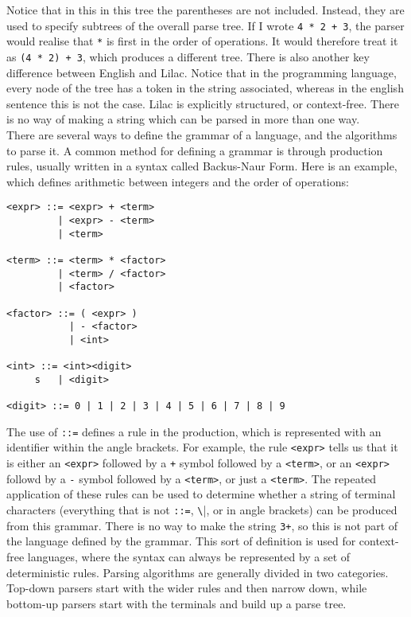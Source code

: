 \documentclass[a4paper, 11pt]{report}
\begin{document}
Notice that in this in this tree the parentheses are not included. Instead, they are used to specify subtrees of the overall parse tree. If I wrote \verb|4 * 2 + 3|, the parser would realise that \verb|*| is first in the order of operations. It would therefore treat it as \verb|(4 * 2) + 3|, which produces a different tree. There is also another key difference between English and Lilac. Notice that in the programming language, every node of the tree has a token in the string associated, whereas in the english sentence this is not the case. Lilac is explicitly structured, or context-free. There is no way of making a string which can be parsed in more than one way.\\

There are several ways to define the grammar of a language, and the algorithms to parse it. A common method for defining a grammar is through production rules, usually written in a syntax called Backus-Naur Form. Here is an example, which defines arithmetic between integers and the order of operations:
\begin{verbatim}
<expr> ::= <expr> + <term>
         | <expr> - <term>
         | <term>

<term> ::= <term> * <factor>
         | <term> / <factor>
         | <factor>

<factor> ::= ( <expr> )
           | - <factor>
           | <int>

<int> ::= <int><digit>
     s   | <digit>

<digit> ::= 0 | 1 | 2 | 3 | 4 | 5 | 6 | 7 | 8 | 9
\end{verbatim}

The use of \verb|::=| defines a rule in the production, which is represented with an identifier within the angle brackets. For example, the rule \verb|<expr>| tells us that it is either an \verb|<expr>| followed by a \verb|+| symbol followed by a \verb|<term>|, or an \verb|<expr>| followd by a \verb|-| symbol followed by a \verb|<term>|, or just a \verb|<term>|. The repeated application of these rules can be used to determine whether a string of terminal characters (everything that is not \verb|::=|, \verb|\||, or in angle brackets) can be produced from this grammar. There is no way to make the string \verb|3+|, so this is not part of the language defined by the grammar. This sort of definition is used for context-free languages, where the syntax can always be represented by a set of deterministic rules. Parsing algorithms are generally divided in two categories. Top-down parsers start with the wider rules and then narrow down, while bottom-up parsers start with the terminals and build up a parse tree.\\
\end{document}
